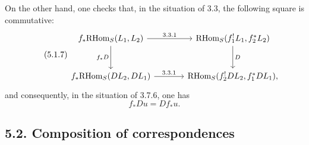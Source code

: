 \documentclass[11pt]{article}
\providecommand{\RHom}{\mathrm{RHom}}
\begin{document}
On the other hand, one checks that, in the situation of 3.3, the following square is commutative:
\begin{equation}
\tag{5.1.7}
\begin{tikzcd}[column sep=large,row sep=large]
f_*\RHom_S(L_1,L_2) \arrow[r,"3.3.1"] \arrow[d,"f_*D"']
& \RHom_S(f_1^!L_1,f_2^*L_2) \arrow[d,"D"] \\
f_*\RHom_S(DL_2,DL_1) \arrow[r,"3.3.1"]
& \RHom_S(f_2^!DL_2,f_1^*DL_1),
\end{tikzcd}
\end{equation}
and consequently, in the situation of 3.7.6, one has
\begin{equation}
\tag{5.1.8}
f_*Du=Df_*u.
\end{equation}

\subsection*{5.2. Composition of correspondences}
\end{document}
